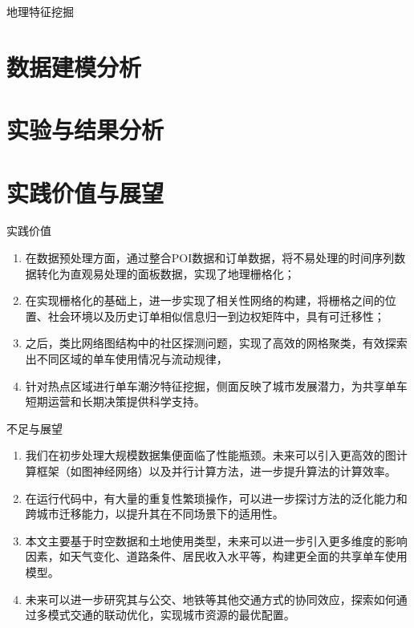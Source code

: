 \documentclass[11pt,aspectratio=149]{ctexbeamer}
\begin{document}
\begin{frame}{地理特征挖掘}
    
\end{frame}

\section{数据建模分析}

\section{实验与结果分析}

\section{实践价值与展望}


\begin{frame}{实践价值}

\begin{enumerate}
    \item 在数据预处理方面，通过整合POI数据和订单数据，将不易处理的时间序列数据转化为直观易处理的面板数据，实现了地理栅格化；
    \item 在实现栅格化的基础上，进一步实现了相关性网络的构建，将栅格之间的位置、社会环境以及历史订单相似信息归一到边权矩阵中，具有可迁移性；
    \item 之后，类比网络图结构中的社区探测问题，实现了高效的网格聚类，有效探索出不同区域的单车使用情况与流动规律，
    \item 针对热点区域进行单车潮汐特征挖掘，侧面反映了城市发展潜力，为共享单车短期运营和长期决策提供科学支持。
\end{enumerate}

\end{frame}

\begin{frame}{不足与展望}
\begin{enumerate}
    \item 我们在初步处理大规模数据集便面临了性能瓶颈。未来可以引入更高效的图计算框架（如图神经网络）以及并行计算方法，进一步提升算法的计算效率。

    \item 在运行代码中，有大量的重复性繁琐操作，可以进一步探讨方法的泛化能力和跨城市迁移能力，以提升其在不同场景下的适用性。
    
    \item 本文主要基于时空数据和土地使用类型，未来可以进一步引入更多维度的影响因素，如天气变化、道路条件、居民收入水平等，构建更全面的共享单车使用模型。

    \item  未来可以进一步研究其与公交、地铁等其他交通方式的协同效应，探索如何通过多模式交通的联动优化，实现城市资源的最优配置。
\end{enumerate}
\end{frame}
\end{document}

